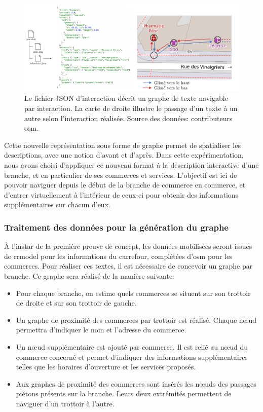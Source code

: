 \begin{figure}[ht]
    \centering
    \includegraphics[width=\textwidth]{images/experimentation/exemple_deri2.pdf}
    \caption[Exemple de fichier DERi 2]{Le fichier JSON d’interaction décrit un graphe de texte navigable par interaction. La carte de droite illustre le passage d'un texte à un autre selon l'interaction réalisée. Source des données: contributeurs \gls{osm}.}
    \label{fig:experimentation_deri2_exemple}
\end{figure}

Cette nouvelle représentation sous forme de graphe permet de spatialiser les descriptions, avec une notion d'avant et d'après. Dans cette expérimentation, nous avons choisi d'appliquer ce nouveau format  à la description interactive d'une branche, et en particulier de ses commerces et services. L'objectif est ici de pouvoir naviguer depuis le début de la branche de commerce en commerce, et d'entrer virtuellement à l'intérieur de ceux-ci pour obtenir des informations supplémentaires sur chacun d'eux. 

\subsubsection{Traitement des données pour la génération du graphe}

À l'instar de la première preuve de concept, les données mobilisées seront issues de crmodel pour les informations du carrefour, complétées d'\gls{osm} pour les commerces. Pour réaliser ces textes, il est nécessaire de concevoir un graphe par branche. Ce graphe sera réalisé de la manière suivante:

\begin{itemize}
    \item Pour chaque branche, on estime quels commerces se situent sur son trottoir de droite et sur son trottoir de gauche.
    \item Un graphe de proximité des commerces par trottoir est réalisé. Chaque nœud permettra d'indiquer le nom et l'adresse du commerce.
    \item Un nœud supplémentaire est ajouté par commerce. Il est relié au nœud du commerce concerné et permet d'indiquer des informations supplémentaires telles que les horaires d'ouverture et les services proposés.
    \item Aux graphes de proximité des commerces sont insérés les nœuds des passages piétons présents sur la branche. Leurs deux extrémités permettent de naviguer d'un trottoir à l'autre.
\end{itemize}

